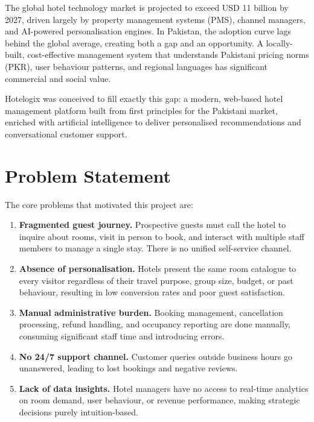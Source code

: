 \documentclass[12pt,a4paper]{report}
\begin{document}
The global hotel technology market is projected to exceed USD 11 billion by 2027, driven largely by property management systems (PMS), channel managers, and AI-powered personalisation engines. In Pakistan, the adoption curve lags behind the global average, creating both a gap and an opportunity. A locally-built, cost-effective management system that understands Pakistani pricing norms (PKR), user behaviour patterns, and regional languages has significant commercial and social value.

Hotelogix was conceived to fill exactly this gap: a modern, web-based hotel management platform built from first principles for the Pakistani market, enriched with artificial intelligence to deliver personalised recommendations and conversational customer support.

\section{Problem Statement}

The core problems that motivated this project are:

\begin{enumerate}[leftmargin=*, label=\arabic*.]
  \item \textbf{Fragmented guest journey.} Prospective guests must call the hotel to inquire about rooms, visit in person to book, and interact with multiple staff members to manage a single stay. There is no unified self-service channel.

  \item \textbf{Absence of personalisation.} Hotels present the same room catalogue to every visitor regardless of their travel purpose, group size, budget, or past behaviour, resulting in low conversion rates and poor guest satisfaction.

  \item \textbf{Manual administrative burden.} Booking management, cancellation processing, refund handling, and occupancy reporting are done manually, consuming significant staff time and introducing errors.

  \item \textbf{No 24/7 support channel.} Customer queries outside business hours go unanswered, leading to lost bookings and negative reviews.

  \item \textbf{Lack of data insights.} Hotel managers have no access to real-time analytics on room demand, user behaviour, or revenue performance, making strategic decisions purely intuition-based.
\end{enumerate}
\end{document}
